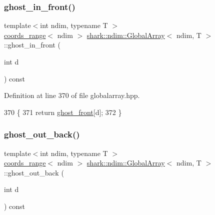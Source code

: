 \subsubsection{\texorpdfstring{ghost\+\_\+in\+\_\+front()}{ghost\_in\_front()}}
{\footnotesize\ttfamily template$<$int ndim, typename T $>$ \\
\hyperlink{structshark_1_1ndim_1_1coords__range}{coords\+\_\+range}$<$ ndim $>$ \hyperlink{classshark_1_1ndim_1_1_global_array}{shark\+::ndim\+::\+Global\+Array}$<$ ndim, T $>$\+::ghost\+\_\+in\+\_\+front (\begin{DoxyParamCaption}\item[{int}]{d }\end{DoxyParamCaption}) const\hspace{0.3cm}{\ttfamily [inline]}}



Definition at line 370 of file globalarray.\+hpp.


\begin{DoxyCode}
370                                                                                  \{
371                     \textcolor{keywordflow}{return} \hyperlink{classshark_1_1ndim_1_1_global_array_a48ce861293f294f003ef16ebd49eb942}{ghost\_front}[d];
372                 \}
\end{DoxyCode}
\hypertarget{classshark_1_1ndim_1_1_global_array_ae4618013580af820c76c7e48d6de874a}{}\label{classshark_1_1ndim_1_1_global_array_ae4618013580af820c76c7e48d6de874a} 
\subsubsection{\texorpdfstring{ghost\+\_\+out\+\_\+back()}{ghost\_out\_back()}}
{\footnotesize\ttfamily template$<$int ndim, typename T $>$ \\
\hyperlink{structshark_1_1ndim_1_1coords__range}{coords\+\_\+range}$<$ ndim $>$ \hyperlink{classshark_1_1ndim_1_1_global_array}{shark\+::ndim\+::\+Global\+Array}$<$ ndim, T $>$\+::ghost\+\_\+out\+\_\+back (\begin{DoxyParamCaption}\item[{int}]{d }\end{DoxyParamCaption}) const\hspace{0.3cm}{\ttfamily [inline]}}



